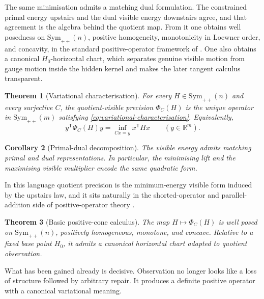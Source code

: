 \documentclass[11pt]{article}
\numberwithin{equation}{section}
\newcommand{\Sym}{\mathrm{Sym}}
\theoremstyle{thmcompact}
\newtheorem{theorem}{Theorem}[section]
\newtheorem{corollary}[theorem]{Corollary}
\theoremstyle{remark}
\begin{document}
The same minimisation admits a matching dual formulation. The constrained primal energy upstairs and the dual visible energy downstairs agree, and that agreement is the algebra behind the quotient map. From it one obtains well posedness on $\Sym_{++}(n)$, positive homogeneity, monotonicity in Loewner order, and concavity, in the standard positive-operator framework of \cite{Loewner1934,Ando1979,HansenPedersen1982,Bhatia1997,Bhatia2007}. One also obtains a canonical $H_0$-horizontal chart, which separates genuine visible motion from gauge motion inside the hidden kernel and makes the later tangent calculus transparent.

\begin{theorem}[Variational characterisation]
\label{thm:variational}
For every $H \in \Sym_{++}(n)$ and every surjective $C$, the quotient-visible precision $\Phi_C(H)$ is the unique operator in $\Sym_{++}(m)$ satisfying \eqref{eq:variational-characterisation}. Equivalently,
\begin{equation}
y^{\mathsf T}\Phi_C(H)y
=
\inf_{Cx=y} x^{\mathsf T} H x
\qquad
(y \in \mathbb{R}^m).
\end{equation}
\end{theorem}

\begin{corollary}[Primal-dual decomposition]
The visible energy admits matching primal and dual representations. In particular, the minimising lift and the maximising visible multiplier encode the same quadratic form.
\end{corollary}

In this language quotient precision is the minimum-energy visible form induced by the upstairs law, and it sits naturally in the shorted-operator and parallel-addition side of positive-operator theory \cite{AndersonDuffin1969,Anderson1971,KuboAndo1980,PuszWoronowicz1975}.

\begin{theorem}[Basic positive-cone calculus]
\label{thm:basic-F}
The map $H \mapsto \Phi_C(H)$ is well posed on $\Sym_{++}(n)$, positively homogeneous, monotone, and concave. Relative to a fixed base point $H_0$, it admits a canonical horizontal chart adapted to quotient observation.
\end{theorem}

What has been gained already is decisive. Observation no longer looks like a loss of structure followed by arbitrary repair. It produces a definite positive operator with a canonical variational meaning.
\end{document}
